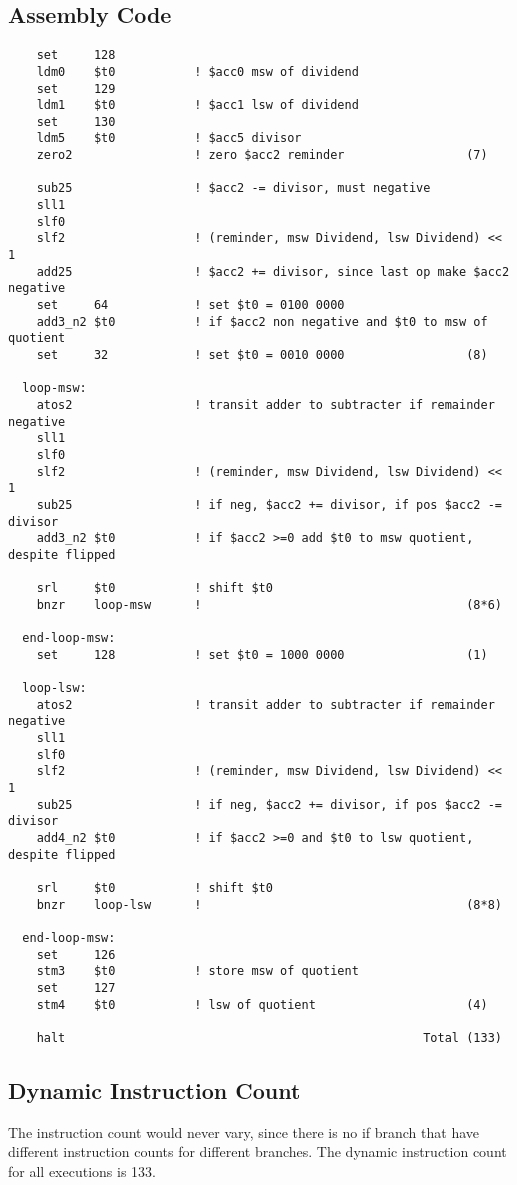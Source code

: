 \documentclass{article}
\begin{document}
  \subsection{Assembly Code}
  \begin{lstlisting}
    set     128
    ldm0    $t0           ! $acc0 msw of dividend
    set     129
    ldm1    $t0           ! $acc1 lsw of dividend
    set     130
    ldm5    $t0           ! $acc5 divisor
    zero2                 ! zero $acc2 reminder                 (7)

    sub25                 ! $acc2 -= divisor, must negative
    sll1
    slf0
    slf2                  ! (reminder, msw Dividend, lsw Dividend) << 1
    add25                 ! $acc2 += divisor, since last op make $acc2 negative
    set     64            ! set $t0 = 0100 0000
    add3_n2 $t0           ! if $acc2 non negative and $t0 to msw of quotient
    set     32            ! set $t0 = 0010 0000                 (8)

  loop-msw:
    atos2                 ! transit adder to subtracter if remainder negative
    sll1
    slf0
    slf2                  ! (reminder, msw Dividend, lsw Dividend) << 1
    sub25                 ! if neg, $acc2 += divisor, if pos $acc2 -= divisor
    add3_n2 $t0           ! if $acc2 >=0 add $t0 to msw quotient, despite flipped

    srl     $t0           ! shift $t0
    bnzr    loop-msw      !                                     (8*6)

  end-loop-msw:
    set     128           ! set $t0 = 1000 0000                 (1)

  loop-lsw:
    atos2                 ! transit adder to subtracter if remainder negative
    sll1
    slf0
    slf2                  ! (reminder, msw Dividend, lsw Dividend) << 1
    sub25                 ! if neg, $acc2 += divisor, if pos $acc2 -= divisor
    add4_n2 $t0           ! if $acc2 >=0 and $t0 to lsw quotient, despite flipped

    srl     $t0           ! shift $t0
    bnzr    loop-lsw      !                                     (8*8)

  end-loop-msw:
    set     126
    stm3    $t0           ! store msw of quotient
    set     127
    stm4    $t0           ! lsw of quotient                     (4)

    halt                                                  Total (133)
  \end{lstlisting}
  \subsection{Dynamic Instruction Count}
  \qquad The instruction count would never vary, since there is no if branch that have different
  instruction counts for different branches. The dynamic instruction count for all executions is 133.
\end{document}
